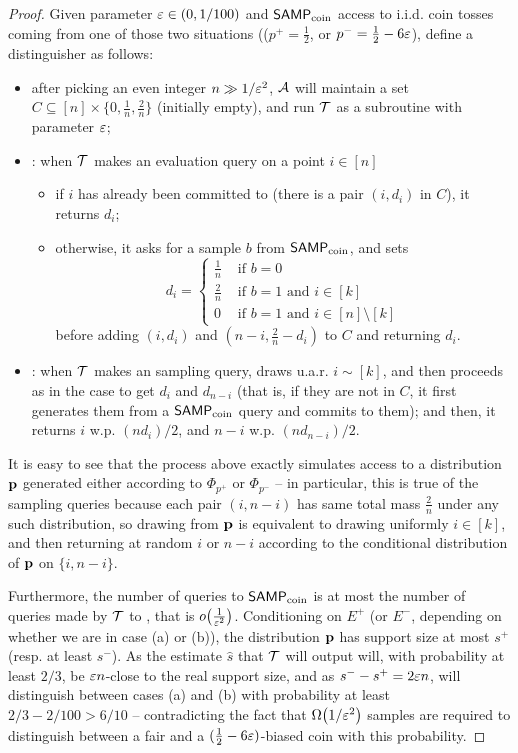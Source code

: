 \begin{proof}
Given parameter $\varepsilon\in(0,1/100)$ and ${\sf SAMP}_\text{coin}$ access to i.i.d. coin tosses coming from one of those two situations (($p^+=\frac{1}{2}$, or $p^-=\frac{1}{2}-6\varepsilon$), define a distinguisher \Algo as follows:
\begin{itemize}
  \item after picking an even integer $n\gg 1/\varepsilon^2$, $\mathcal{A}$ will maintain a set $C\subseteq[n]\times\{0, \frac{1}{n}, \frac{2}{n}\}$ (initially empty), and run $\mathcal{T}$ as a subroutine with parameter $\varepsilon$;
  \item \EVAL: when $\mathcal{T}$ makes an evaluation query on a point $i\in[n]$
  \begin{itemize}
    \item if $i$ has already been committed to (there is a pair $(i,d_i)$ in $C$), it returns $d_i$;
    \item otherwise, it asks for a sample $b$ from ${\sf SAMP}_\text{coin}$, and sets
    \[
      d_i = \begin{cases}
        \frac{1}{n} &\text{ if } b = 0\\
        \frac{2}{n} &\text{ if } b = 1 \text{ and } i\in[k]\\
        0 &\text{ if } b = 1 \text{ and } i\in[n]\setminus [k]
      \end{cases}
    \]
    before adding $(i, d_i)$ and $(n-i, \frac{2}{n}-d_i)$ to $C$ and returning $d_i$.
  \end{itemize}
 \item \SAMP: when $\mathcal{T}$ makes an sampling query, \Algo draws u.a.r. $i\sim[k]$, and then proceeds as in the \EVAL case to get $d_i$ and $d_{n-i}$ (that is, if they are not in $C$, it first generates them from a ${\sf SAMP}_\text{coin}$ query and commits to them); and then, it returns $i$ w.p. $(n d_i)/2$, and $n-i$ w.p. $(n d_{n-i})/2$.
\end{itemize}
It is easy to see that the process above exactly simulates \pdfsamp access to a distribution $\mathbf{p}$ generated either according to $\Phi_{p^+}$ or $\Phi_{p^-}$ -- in particular, this is true of the sampling queries because each pair $(i, n-i)$ has same total mass $\frac{2}{n}$ under any such distribution, so drawing from $\mathbf{p}$ is equivalent to drawing uniformly $i\in[k]$, and then returning at random $i$ or $n-i$ according to the conditional distribution of $\mathbf{p}$ on $\{i, n-i\}$.

Furthermore, the number of queries to ${\sf SAMP}_\text{coin}$ is at most the number of queries made by $\mathcal{T}$ to \Algo, that is $\littleO{\frac{1}{\eps^2}}$. Conditioning on $E^+$ (or $E^-$, depending on whether we are in case \textsf{(a)} or \textsf{(b)}), the distribution $\mathbf{p}$ has support size at most $s^+$ (resp. at least $s^-$). As the estimate $\hat{s}$ that $\mathcal{T}$ will output will, with probability at least $2/3$, be $\varepsilon n$-close to the real support size, and as $s^--s^+ = 2\varepsilon n$, \Algo will distinguish between cases \textsf{(a)} and \textsf{(b)} with probability at least $2/3-2/100 > 6/10$ -- contradicting the fact that $\bigOmega{1/\eps^2}$ samples are required to distinguish between a fair and a $(\frac{1}{2}-6\varepsilon)$-biased coin with this probability.
 \end{proof}
